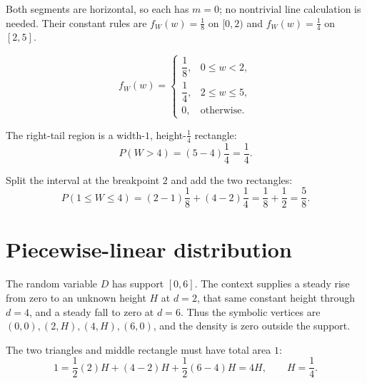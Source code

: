 	Both segments are horizontal, so each has $m=0$; no nontrivial line
	calculation is needed.  Their constant rules are $f_W(w)=\frac18$ on
	$[0,2)$ and $f_W(w)=\frac14$ on $[2,5]$.
	
	\[
	f_W(w)=\begin{cases}
		\dfrac18,&0\le w<2,\\[1mm]
		\dfrac14,&2\le w\le5,\\[1mm]
		0,&\text{otherwise.}
	\end{cases}
	\]
	
	The right-tail region is a width-$1$, height-$\frac14$ rectangle:
	\[
	P(W>4)=(5-4)\frac14=\frac14.
	\]
	
	Split the interval at the breakpoint $2$ and add the two rectangles:
	\[
	P(1\le W\le4)=(2-1)\frac18+(4-2)\frac14=\frac18+\frac12=\frac58.
	\]
	
	
	\section{Piecewise-linear distribution}
	
	The random variable $D$ has support $[0,6]$.  The context supplies a steady
	rise from zero to an unknown height $H$ at $d=2$, that same constant height
	through $d=4$, and a steady fall to zero at $d=6$.  Thus the symbolic vertices
	are $(0,0),(2,H),(4,H),(6,0)$, and the density is zero outside the support.
	
	The two triangles and middle rectangle must have total area $1$:
	\[
	1=\frac12(2)H+(4-2)H+\frac12(6-4)H=4H,
	\qquad H=\frac14.
	\]
	
